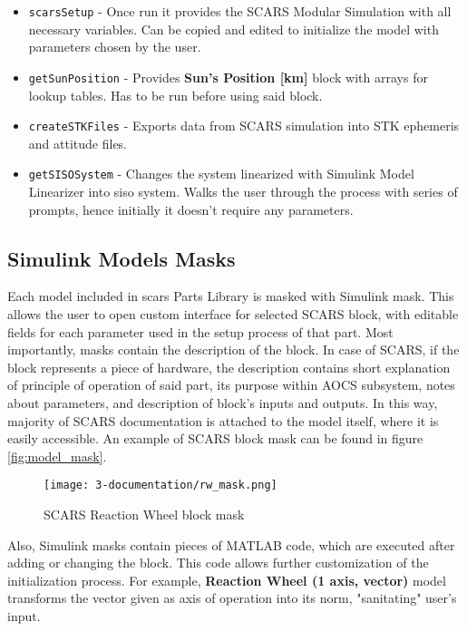         \begin{itemize}
            \item \verb|scarsSetup| - Once run it provides the SCARS Modular Simulation with all necessary variables. Can be copied and edited to initialize the model with parameters chosen by the user.
            \item \verb|getSunPosition| - Provides \textbf{Sun's Position [km]} block with arrays for lookup tables. Has to be run before using said block.
            \item \verb|createSTKFiles| - Exports data from SCARS simulation into STK ephemeris and attitude files.
            \item \verb|getSISOSystem| - Changes the system linearized with Simulink Model Linearizer into \ac{siso} system. Walks the user through the process with series of prompts, hence initially it doesn't require any parameters.
        \end{itemize}
        

    \subsection{Simulink Models Masks}
        Each model included in \ac{scars} Parts Library is masked with Simulink mask\cite{masks}. This allows the user to open custom interface for selected SCARS block, with editable fields for each parameter used in the setup process of that part. Most importantly, masks contain the description of the block. In case of SCARS, if the block represents a piece of hardware, the description contains short explanation of principle of operation of said part, its purpose within AOCS subsystem, notes about parameters, and description of block's inputs and outputs. In this way, majority of SCARS documentation is attached to the model itself, where it is easily accessible. An example of SCARS block mask can be found in figure \autoref{fig:model_mask}.
        
        \begin{figure}[H]
            \centering
            \texttt{[image: 3-documentation/rw\_mask.png]}
            \caption{SCARS Reaction Wheel block mask}
            \label{fig:model_mask}
        \end{figure}
        
        Also, Simulink masks contain pieces of MATLAB code, which are executed after adding or changing the block. This code allows further customization of the initialization process. For example, \textbf{Reaction Wheel (1 axis, vector)} model transforms the vector given as axis of operation into its norm, "sanitating" user's input. 
